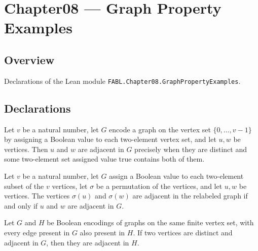\chapter{Chapter08 — Graph Property Examples}
\section{Overview}

Declarations of the Lean module \texttt{FABL.Chapter08.GraphPropertyExamples}.

\section{Declarations}

\begin{definition}
\label{FABL.EncodedGraphAdjacent}
\leanok
{}
Let $v$ be a natural number, let $G$ encode a graph on the vertex set $\{0,\ldots,v-1\}$
by assigning a Boolean value to each two-element vertex set, and let $u,w$ be vertices.
Then $u$ and $w$ are adjacent in $G$ precisely when they are distinct and some
two-element set assigned value true contains both of them.
\end{definition}

\begin{theorem}
\label{FABL.encodedGraphAdjacent_permute_iff}
\leanok
{}
Let $v$ be a natural number, let $G$ assign a Boolean value to each two-element subset
of the $v$ vertices, let $\sigma$ be a permutation of the vertices, and let $u,w$ be
vertices. The vertices $\sigma(u)$ and $\sigma(w)$ are adjacent in the relabeled graph
if and only if $u$ and $w$ are adjacent in $G$.
\end{theorem}

\begin{theorem}
\label{FABL.EncodedGraphAdjacent.mono}
\leanok
{}
Let $G$ and $H$ be Boolean encodings of graphs on the same finite vertex set, with every
edge present in $G$ also present in $H$. If two vertices are distinct and adjacent in
$G$, then they are adjacent in $H$.
\end{theorem}

